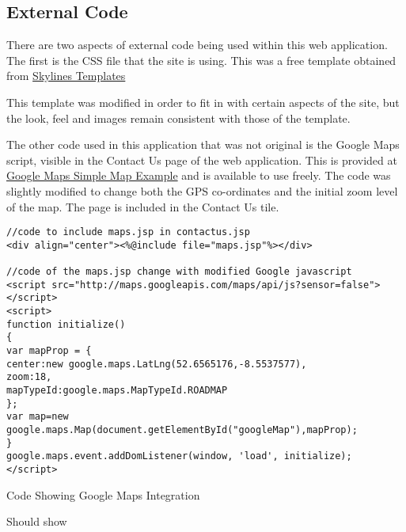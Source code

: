 \subsection{External Code}

There are two aspects of external code being used within this web application. The first is the CSS file that the site is using. This was a free template obtained from \href{http://skylinestemplates.blogspot.ie/2011/11/greefies-solution-xhtml-and-css.html}{Skylines Templates}

This template was modified in order to fit in with certain aspects of the site, but the look, feel and images remain consistent with those of the template.

The other code used in this application that was not original is the Google Maps script, visible in the Contact Us page of the web application. This is provided at \href{https://developers.google.com/maps/documentation/javascript/examples/map-simple}{Google Maps Simple Map Example} and is available to use freely. The code was slightly modified to change both the GPS co-ordinates and the initial zoom level of the map. The page is included in the Contact Us tile.
\begin{table}[H]
\begin{lstlisting}
//code to include maps.jsp in contactus.jsp
<div align="center"><%@include file="maps.jsp"%></div>

//code of the maps.jsp change with modified Google javascript
<script src="http://maps.googleapis.com/maps/api/js?sensor=false">
</script>
<script>
function initialize()
{
var mapProp = {
center:new google.maps.LatLng(52.6565176,-8.5537577),
zoom:18,
mapTypeId:google.maps.MapTypeId.ROADMAP
};
var map=new google.maps.Map(document.getElementById("googleMap"),mapProp);
}
google.maps.event.addDomListener(window, 'load', initialize);
</script>

\end{lstlisting}
\caption{Code Showing Google Maps Integration}
\end{table}

Should show




